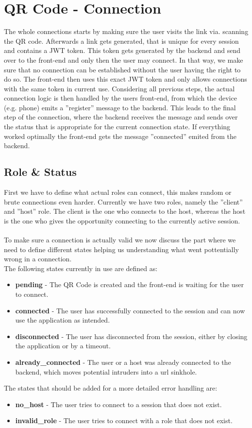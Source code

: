 \section{QR Code - Connection}
The whole connections starts by making sure the user visits the link via. scanning the QR code.
Afterwards a link gets generated, that is unique for every session and contains a JWT token.
This token gets generated by the backend and send over to the front-end and only then the user may connect.
In that way, we make sure that no connection can be established without the user having the right to do so.
The front-end then uses this exact JWT token and only allows connections with the same token in current use.
Considering all previous steps, the actual connection logic is then handled by the users front-end, from which the device (e.g. phone) emits a ''register'' message to the backend.
This leads to the final step of the connection, where the backend receives the message and sends over the status that is appropriate for the current connection state.
If everything worked optimally the front-end gets the message ''connected'' emited from the backend. 
\subsection{Role \& Status}
First we have to define what actual roles can connect, this makes random or brute connections even harder.
Currently we have two roles, namely the ''client'' and ''host'' role.
The client is the one who connects to the host, whereas the host is the one who gives the opportunity connecting to the currently active session. \\ \\

To make sure a connection is actually valid we now discuss the part where we need to define different states helping us understanding what went pottentially wrong in a connection. \\
The following states currently in use are defined as:
\begin{itemize}
    \item \textbf{pending} - The QR Code is created and the front-end is waiting for the user to connect.
    \item \textbf{connected} - The user has successfully connected to the session and can now use the application as intended.
    \item \textbf{disconnected} - The user has disconnected from the session, either by closing the application or by a timeout.
    \item \textbf{already\_connected} - The user or a host was already connected to the backend, which moves potential intruders into a url sinkhole.
\end{itemize}
The states that should be added for a more detailed error handling are:
\begin{itemize}
    \item \textbf{no\_host} - The user tries to connect to a session that does not exist.
    \item \textbf{invalid\_role} - The user tries to connect with a role that does not exist.
\end{itemize}

